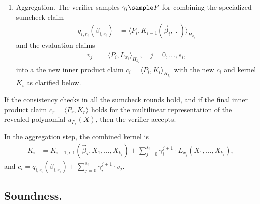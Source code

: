 \begin{protocol}[WHIR]
\begin{enumerate}
\begin{enumerate}
    \end{enumerate}
    \item 
    Aggregation.
    The verifier samples $\gamma_i\sample F$ for combining the specialized sumcheck claim
    \begin{align*}
    q_{i, r_i}(\beta_{i,r_i}) &= \langle P_{i}, K_{i-1}(\vec \beta_{i},\:.\:) \rangle_{H_{k_i}} 
    \end{align*}
    and the evaluation claims
    \begin{align*}
    v_{j} &= \langle P_{i}, L_{x_i}\rangle_{H_{k_i}}, 
    \quad j = 0,\ldots, s_i,
    \end{align*}
    into a the new inner product claim
    $
    c_i = \langle P_{i}, K_{i}\rangle_{H_{k_i}} 
    $
    with the new $c_i$ and kernel $K_{i}$ as clarified below.
\end{enumerate}


If the consistency checks in all the sumcheck rounds hold, and if the final inner product claim $c_r = \langle P_r, K_r\rangle$ holds for the multilinear representation of the revealed polynomial $u_{P_r}(X)$, then the verifier accepts.
\end{protocol}

In the aggregation step, the combined kernel is
\begin{align*}
    K_{i} &=  K_{i-1,i,1}(\vec\beta_{i},X_1,\ldots, X_{k_i}) + \sum_{j=0}^{s_i} \gamma_i^{j+1} \cdot L_{x_{j}}(X_1,\ldots, X_{k_i}),
    \end{align*}
and $c_i = q_{i,r_i}(\beta_{i,r_i}) + \sum_{j=0}^{s_i} \gamma_i^{j+1}\cdot v_{j}$.
    




\subsection{Soundness.}
\label{s:WHIR:soudness:discussion}



